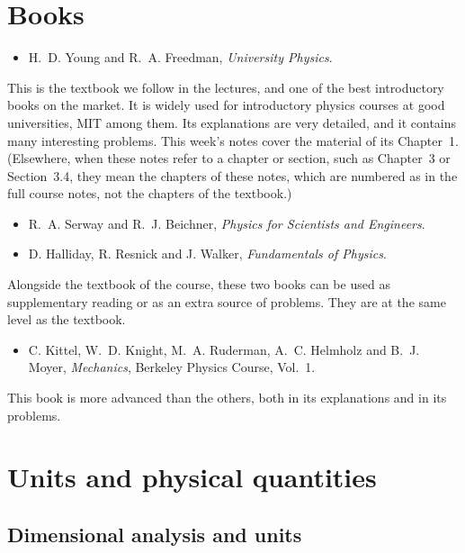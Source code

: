 \documentclass[11pt,a4paper]{article}
\begin{document}
\makenotetitle

\section*{Books}

\begin{itemize}
  \item H.~D. Young and R.~A. Freedman, \emph{University Physics}.
\end{itemize}
This is the textbook we follow in the lectures, and one of the best introductory books on the
market. It is widely used for introductory physics courses at good universities, MIT among them.
Its explanations are very detailed, and it contains many interesting problems. This week's notes
cover the material of its Chapter~1. (Elsewhere, when these notes refer to a chapter or section,
such as Chapter~3 or Section~3.4, they mean the chapters of these notes, which are numbered as in
the full course notes, not the chapters of the textbook.)

\begin{itemize}
  \item R.~A. Serway and R.~J. Beichner, \emph{Physics for Scientists and Engineers}.
  \item D. Halliday, R. Resnick and J. Walker, \emph{Fundamentals of Physics}.
\end{itemize}
Alongside the textbook of the course, these two books can be used as supplementary reading or as
an extra source of problems. They are at the same level as the textbook.

\begin{itemize}
  \item C. Kittel, W.~D. Knight, M.~A. Ruderman, A.~C. Helmholz and B.~J. Moyer,
    \emph{Mechanics}, Berkeley Physics Course, Vol.~1.
\end{itemize}
This book is more advanced than the others, both in its explanations and in its problems.

\setcounter{section}{0}
\section{Units and physical quantities}

\subsection{Dimensional analysis and units}
\end{document}
